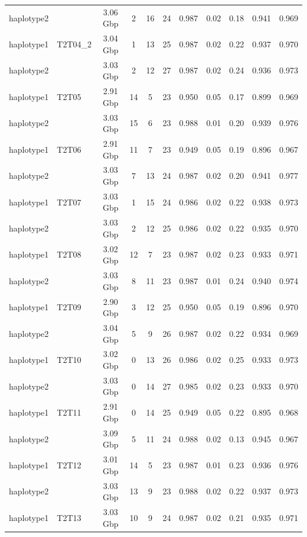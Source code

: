\begin{table}[t]
\begin{tabular*}{0.9\linewidth}{@{\extracolsep{\fill}}l|lccccccccc}
haplotype2 &  & 3.06 Gbp & 2 & 16 & 24 & 0.987 & 0.02 & 0.18 & 0.941 & 0.969 \\ 
haplotype1 & {T2T04\_2} & {3.04 Gbp} & {1} & {13} & {25} & {0.987} & {0.02} & {0.22} & {0.937} & {0.970} \\ 
haplotype2 &  & 3.03 Gbp & 2 & 12 & 27 & 0.987 & 0.02 & 0.24 & 0.936 & 0.973 \\ 
haplotype1 & {T2T05} & {2.91 Gbp} & {14} & {5} & {23} & {0.950} & {0.05} & {0.17} & {0.899} & {0.969} \\ 
haplotype2 &  & 3.03 Gbp & 15 & 6 & 23 & 0.988 & 0.01 & 0.20 & 0.939 & 0.976 \\ 
haplotype1 & {T2T06} & {2.91 Gbp} & {11} & {7} & {23} & {0.949} & {0.05} & {0.19} & {0.896} & {0.967} \\ 
haplotype2 &  & 3.03 Gbp & 7 & 13 & 24 & 0.987 & 0.02 & 0.20 & 0.941 & 0.977 \\ 
haplotype1 & {T2T07} & {3.03 Gbp} & {1} & {15} & {24} & {0.986} & {0.02} & {0.22} & {0.938} & {0.973} \\ 
haplotype2 &  & 3.03 Gbp & 2 & 12 & 25 & 0.986 & 0.02 & 0.22 & 0.935 & 0.970 \\ 
haplotype1 & {T2T08} & {3.02 Gbp} & {12} & {7} & {23} & {0.987} & {0.02} & {0.23} & {0.933} & {0.971} \\ 
haplotype2 &  & 3.03 Gbp & 8 & 11 & 23 & 0.987 & 0.01 & 0.24 & 0.940 & 0.974 \\ 
haplotype1 & {T2T09} & {2.90 Gbp} & {3} & {12} & {25} & {0.950} & {0.05} & {0.19} & {0.896} & {0.970} \\ 
haplotype2 &  & 3.04 Gbp & 5 & 9 & 26 & 0.987 & 0.02 & 0.22 & 0.934 & 0.969 \\ 
haplotype1 & {T2T10} & {3.02 Gbp} & {0} & {13} & {26} & {0.986} & {0.02} & {0.25} & {0.933} & {0.973} \\ 
haplotype2 &  & 3.03 Gbp & 0 & 14 & 27 & 0.985 & 0.02 & 0.23 & 0.933 & 0.970 \\ 
haplotype1 & {T2T11} & {2.91 Gbp} & {0} & {14} & {25} & {0.949} & {0.05} & {0.22} & {0.895} & {0.968} \\ 
haplotype2 &  & 3.09 Gbp & 5 & 11 & 24 & 0.988 & 0.02 & 0.13 & 0.945 & 0.967 \\ 
haplotype1 & {T2T12} & {3.01 Gbp} & {14} & {5} & {23} & {0.987} & {0.01} & {0.23} & {0.936} & {0.976} \\ 
haplotype2 &  & 3.03 Gbp & 13 & 9 & 23 & 0.988 & 0.02 & 0.22 & 0.937 & 0.973 \\ 
haplotype1 & {T2T13} & {3.03 Gbp} & {10} & {9} & {24} & {0.987} & {0.02} & {0.21} & {0.935} & {0.971} \\ 

\end{tabular*}
\end{table}
